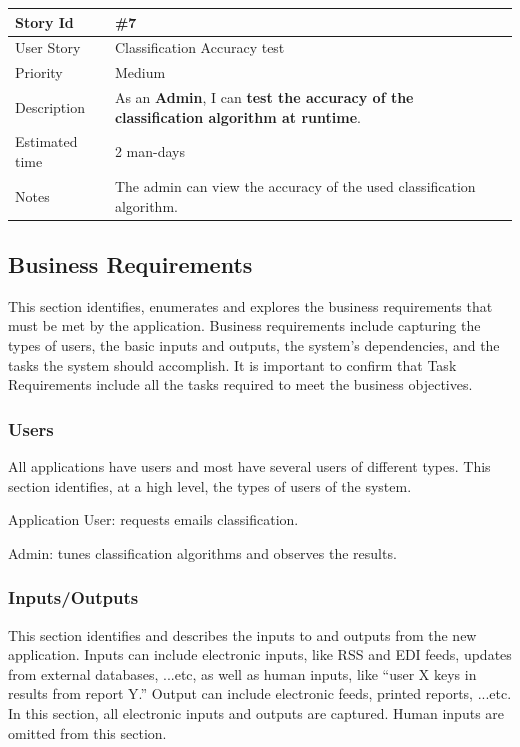 \begin{tabular}{|p{3cm}|p{10cm}|}
\hline
\cellcolor[gray]{0.9} Story Id & \#7 \\ \hline
\cellcolor[gray]{0.9} User Story & Classification Accuracy test \\ \hline
\cellcolor[gray]{0.9} Priority & Medium \\ \hline
\cellcolor[gray]{0.9} Description & 
	As an \textbf{Admin}, I can \textbf{test the accuracy of the 
	classification algorithm at runtime}. \\ \hline
\cellcolor[gray]{0.9} Estimated time & 2 man-days\\ \hline
\cellcolor[gray]{0.9} Notes & 
	The admin can view the accuracy of the used classification algorithm. \\ \hline
\end{tabular}

\newpage
\subsection{Business Requirements}

This section identifies, enumerates and explores the business requirements that must 
be met by the application. Business requirements include capturing the types of users, 
the basic inputs and outputs, the system's dependencies, and the tasks the system should 
accomplish. It is important to confirm that Task Requirements include all the tasks 
required to meet the business objectives.

\subsubsection{Users}
All applications have users and most have several users of different types. This 
section identifies, at a high level, the types of users of the system.

\begin{my_enumerate}
  \item Application User: requests emails classification.
  \item Admin: tunes classification algorithms and observes the results.
\end{my_enumerate}

\subsubsection{Inputs/Outputs}
This section identifies and describes the inputs to and outputs from the new 
application. Inputs can include electronic inputs, like RSS and EDI feeds, 
updates from external databases, ...etc, as well as human inputs, like 
``user X keys in results from report Y.'' Output can include electronic feeds, 
printed reports, ...etc. In this section, all electronic inputs and outputs 
are captured. Human inputs are omitted from this section.

